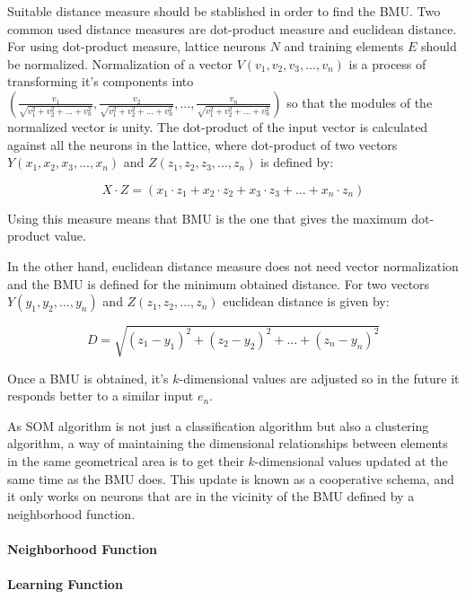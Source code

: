 \documentclass{article}
\begin{document}
Suitable distance measure should be stablished in order to find the BMU. Two common used distance measures are dot-product measure and euclidean distance.
For using dot-product measure, lattice neurons $N$ and training elements $E$ should be normalized. Normalization of a vector $V(v_1, v_2, v_3,...,v_n)$ is a process of transforming it's components into
$(\frac{v_1}{\sqrt{v_1^2+v_2^2+...+v_n^2}},
\frac{v_2}{\sqrt{v_1^2+v_2^2+...+v_n^2}},
...,
\frac{v_n}{\sqrt{v_1^2+v_2^2+...+v_n^2}}
)$
 so that the modules of the normalized vector is unity. The dot-product of the input vector is calculated against all the neurons in the lattice, where dot-product of two vectors $Y(x_1, x_2, x_3,..., x_n)$ and $Z(z_1, z_2, z_3,..., z_n)$ is defined by: 
 
 
\begin{equation}
X \cdot Z = (x_1 \cdot z_1 + x_2 \cdot z_2 + x_3 \cdot z_3 + ... + x_n \cdot z_n)
\end{equation}
 
 
 Using this measure means that BMU is the one that gives the maximum dot-product value.
 
 In the other hand, euclidean distance measure does not need vector normalization and the BMU is defined for the minimum obtained distance. For two vectors $Y(y_1,y_2,...,y_n)$ and $Z(z_1,z_2,...,z_n)$ euclidean distance is given by:
 
\begin{equation}
D = \sqrt{(z_1-y_1)^2 + (z_2-y_2)^2 + ... + (z_n-y_n)^2}
\end{equation}

 Once a BMU is obtained, it's $k$-dimensional values are adjusted so in the future it responds better to a similar input $e_n$.

As SOM algorithm is not just a classification algorithm but also a clustering algorithm, a way of maintaining the dimensional relationships between elements in the same geometrical area is to get their $k$-dimensional values updated at the same time as the BMU does. This update is known as a cooperative schema, and it only works on neurons that are in the vicinity of the BMU defined by a neighborhood function.

\paragraph{Neighborhood Function} %

\paragraph{Learning Function} %
\end{document}
